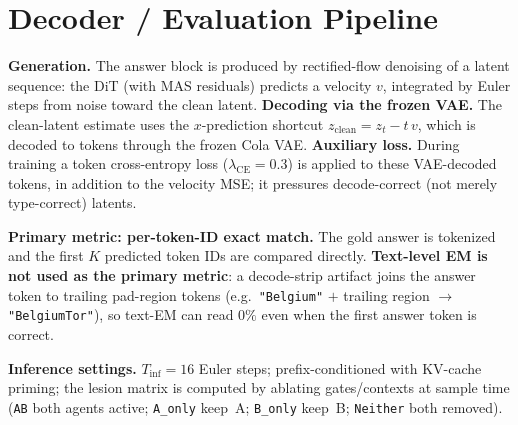\documentclass[10pt]{article}
\begin{document}
\section{Decoder / Evaluation Pipeline}
\textbf{Generation.} The answer block is produced by rectified-flow denoising of a latent
sequence: the DiT (with MAS residuals) predicts a velocity $v$, integrated by Euler steps
from noise toward the clean latent. \textbf{Decoding via the frozen VAE.} The clean-latent
estimate uses the $x$-prediction shortcut $z_{\text{clean}} = z_t - t\,v$, which is decoded
to tokens through the frozen Cola VAE. \textbf{Auxiliary loss.} During training a token
cross-entropy loss ($\lambda_{\text{CE}}{=}0.3$) is applied to these VAE-decoded tokens, in
addition to the velocity MSE; it pressures decode-correct (not merely type-correct) latents.

\noindent\textbf{Primary metric: per-token-ID exact match.} The gold answer is tokenized
and the first $K$ predicted token IDs are compared directly. \textbf{Text-level EM is not
used as the primary metric}: a decode-strip artifact joins the answer token to trailing
pad-region tokens (e.g.\ \texttt{"Belgium"} $+$ trailing region
$\rightarrow$ \texttt{"BelgiumTor"}), so text-EM can read $0\%$ even when the first answer
token is correct.

\noindent\textbf{Inference settings.} $T_{\text{inf}}{=}16$ Euler steps; prefix-conditioned
with KV-cache priming; the lesion matrix is computed by ablating gates/contexts at sample
time (\texttt{AB} both agents active; \texttt{A\_only} keep~A; \texttt{B\_only} keep~B;
\texttt{Neither} both removed).
\end{document}
